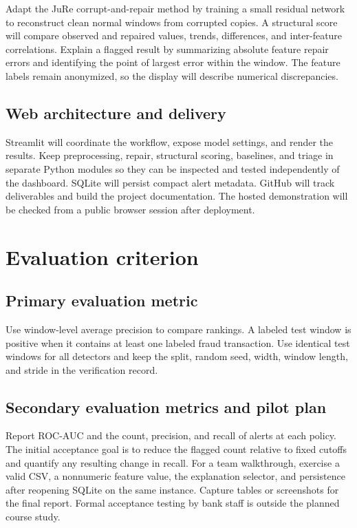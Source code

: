 \documentclass[11pt,a4paper]{article}
\begin{document}
Adapt the JuRe corrupt-and-repair method by training a small residual network to reconstruct clean normal windows from corrupted copies. A structural score will compare observed and repaired values, trends, differences, and inter-feature correlations. Explain a flagged result by summarizing absolute feature repair errors and identifying the point of largest error within the window. The feature labels remain anonymized, so the display will describe numerical discrepancies.

\subsection{Web architecture and delivery}
Streamlit will coordinate the workflow, expose model settings, and render the results. Keep preprocessing, repair, structural scoring, baselines, and triage in separate Python modules so they can be inspected and tested independently of the dashboard. SQLite will persist compact alert metadata. GitHub will track deliverables and build the project documentation. The hosted demonstration will be checked from a public browser session after deployment.

\section{Evaluation criterion}
\subsection{Primary evaluation metric}
Use window-level average precision to compare rankings. A labeled test window is positive when it contains at least one labeled fraud transaction. Use identical test windows for all detectors and keep the split, random seed, width, window length, and stride in the verification record.

\subsection{Secondary evaluation metrics and pilot plan}
Report ROC-AUC and the count, precision, and recall of alerts at each policy. The initial acceptance goal is to reduce the flagged count relative to fixed cutoffs and quantify any resulting change in recall. For a team walkthrough, exercise a valid CSV, a nonnumeric feature value, the explanation selector, and persistence after reopening SQLite on the same instance. Capture tables or screenshots for the final report. Formal acceptance testing by bank staff is outside the planned course study.
\end{document}
